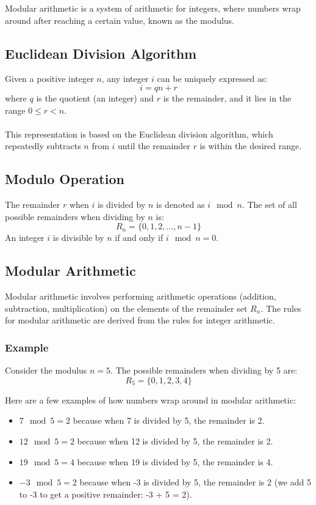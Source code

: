 \documentclass[11pt, letterpaper]{article}
\begin{document}
Modular arithmetic is a system of arithmetic for integers, where numbers wrap around after reaching a certain value, known as the modulus. 

\subsection{Euclidean Division Algorithm}
Given a positive integer \( n \), any integer \( i \) can be uniquely expressed as:
\[
i = qn + r
\]
where \( q \) is the quotient (an integer) and \( r \) is the remainder, and it lies in the range \( 0 \leq r < n \).
\\ \\
This representation is based on the Euclidean division algorithm, which repeatedly subtracts \( n \) from \( i \) until the remainder \( r \) is within the desired range.

\subsection{Modulo Operation}
The remainder \( r \) when \( i \) is divided by \( n \) is denoted as \( i \mod n \). The set of all possible remainders when dividing by \( n \) is:
\[
R_n = \{0, 1, 2, \ldots, n - 1\}
\]
An integer \( i \) is divisible by \( n \) if and only if \( i \mod n = 0 \).

\subsection{Modular Arithmetic}
Modular arithmetic involves performing arithmetic operations (addition, subtraction, multiplication) on the elements of the remainder set \( R_n \). The rules for modular arithmetic are derived from the rules for integer arithmetic.

\subsubsection*{Example}
Consider the modulus \( n = 5 \). The possible remainders when dividing by 5 are:
\[
R_5 = \{0, 1, 2, 3, 4\}
\]

Here are a few examples of how numbers wrap around in modular arithmetic:

\begin{itemize}
    \item \( 7 \mod 5 = 2 \) because when 7 is divided by 5, the remainder is 2.
    \item \( 12 \mod 5 = 2 \) because when 12 is divided by 5, the remainder is 2.
    \item \( 19 \mod 5 = 4 \) because when 19 is divided by 5, the remainder is 4.
    \item \( -3 \mod 5 = 2 \) because when -3 is divided by 5, the remainder is 2 (we add 5 to -3 to get a positive remainder: -3 + 5 = 2).
\end{itemize}
\end{document}
